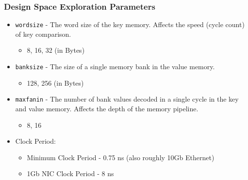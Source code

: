 \frametitle{Design Space Exploration Parameters}

\begin{itemize}
    \item \texttt{wordsize} - The word size of the key memory. Affects the speed
        (cycle count) of key comparison.
        \begin{itemize}
            \item 8, 16, 32 (in Bytes)
        \end{itemize}
    \item \texttt{banksize} - The size of a single memory bank in the value memory.
        \begin{itemize}
            \item 128, 256 (in Bytes)
        \end{itemize}
    \item \texttt{maxfanin} - The number of bank values decoded in a single cycle in
        the key and value memory. Affects the depth of the memory pipeline.
        \begin{itemize}
            \item 8, 16
        \end{itemize}
    \item Clock Period:
        \begin{itemize}
            \item Minimum Clock Period - 0.75 ns (also roughly 10Gb Ethernet)
            \item 1Gb NIC Clock Period - 8 ns
        \end{itemize}
\end{itemize}
